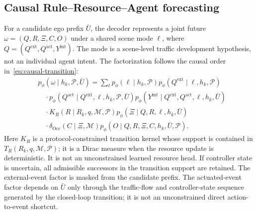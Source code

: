 \documentclass[letterpaper]{article} %
\newcommand{\Pset}{\ensuremath{\mathcal P}}
\newcommand{\Mset}{\ensuremath{\mathcal M}}
\begin{document}
\subsection{Causal Rule--Resource--Agent forecasting}
\label{sec:rra}
For a candidate ego prefix $\bar U$, the decoder represents a joint future
$\omega=(Q,R,\Xi,C,O)$ under a shared scene mode $\ell$, where
$Q=(Q^{\mathrm{ext}},Q^{\mathrm{act}},Y^{\mathrm{int}})$. The mode is a
scene-level traffic development hypothesis, not an individual agent intent.
The factorization follows the causal order in~\eqref{eq:causal-transition}:
\begin{align}
&p_\phi(\omega\mid h_k,\Pset,\bar U)=\sum_\ell
p_\phi(\ell\mid h_k,\Pset)
 p_\phi(Q^{\mathrm{ext}}\mid\ell,h_k,\Pset)\nonumber\\
&\quad\cdot p_\phi(Q^{\mathrm{act}}\mid Q^{\mathrm{ext}},\ell,h_k,
\Pset,\bar U)
 p_\phi(Y^{\mathrm{int}}\mid Q^{\mathrm{ext}},Q^{\mathrm{act}},\ell,h_k,\bar U)\nonumber\\
&\quad\cdot K_R(R\mid R_k,q,\Mset,\Pset)
 p_\phi(\Xi\mid Q,R,\ell,h_k,\bar U)\nonumber\\
&\quad\cdot \delta_{\operatorname{Occ}}(C\mid\Xi,\Mset)
 p_\phi(O\mid Q,R,\Xi,C,h_k,\bar U,\Pset).
\label{eq:rra-factor}
\end{align}
Here $K_R$ is a protocol-constrained transition kernel whose support is
contained in $T_R(R_k,q,\Mset,\Pset)$; it is a Dirac measure when the
resource update is deterministic. It is not an unconstrained learned resource
head. If controller state is uncertain, all admissible successors in the
transition support are retained. The external-event factor is masked from the candidate
prefix. The actuated-event factor depends on $\bar U$ only through the
traffic-flow and controller-state sequence generated by the closed-loop
transition; it is not an unconstrained direct action-to-event shortcut.
\end{document}
